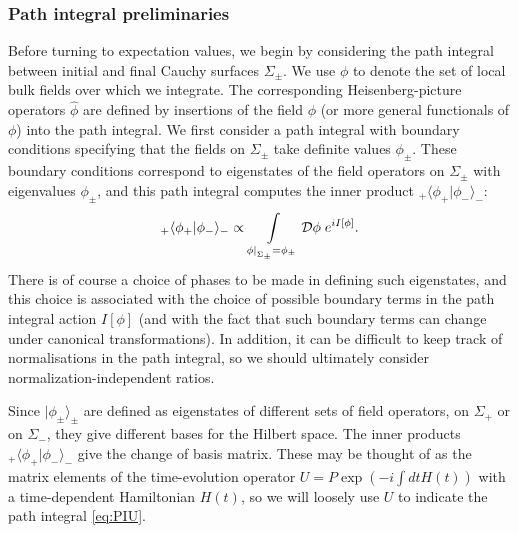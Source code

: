 \documentclass[letterpaper,12pt]{article}
\begin{document}
\subsubsection{Path integral preliminaries}
\label{sec:PIprelim}

Before turning to expectation values, we begin by considering the path integral between initial and final Cauchy surfaces $\Sigma_\pm$.  We use $\phi$ to denote the set of local bulk fields over which we integrate. The corresponding Heisenberg-picture operators $\hat \phi$ are defined by insertions of the field $\phi$ (or more general functionals of $\phi$) into the path integral.  We first consider a path integral with boundary conditions specifying that the fields on $\Sigma_\pm$ take definite values $\phi_{\pm}$. These boundary conditions correspond to eigenstates of the field operators on $\Sigma_\pm$ with eigenvalues $\phi_\pm$, and this path integral computes the inner product ${}_+ \langle \phi_+|\phi_-\rangle_-$:
\begin{equation}\label{eq:PIU}
	{}_+ \langle \phi_+|\phi_-\rangle_- \propto \int\displaylimits_{\left.\phi\right|_{\Sigma_\pm} = \phi_\pm} \mathcal{D}\phi \; e^{i I[\phi]}.
\end{equation}
  There is of course a choice of phases to be made in defining such eigenstates, and this choice is associated with the choice of possible boundary terms in the path integral action $I[\phi]$ (and with the fact that such boundary terms can change under canonical transformations). In addition, it can be difficult to keep track of normalisations in the path integral, so we should ultimately consider normalization-independent ratios. %

Since $|\phi_\pm\rangle_\pm$ are defined as eigenstates of different sets of field operators, on $\Sigma_+$ or on $\Sigma_-$, they give different bases for the Hilbert space. The inner products ${}_+ \langle \phi_+|\phi_-\rangle_-$ give the change of basis matrix. These may be thought of as the matrix elements of the time-evolution operator $U = P\exp\left(-i\int dt H(t)\right)$ with a time-dependent Hamiltonian $H(t)$, so we will loosely use $U$ to indicate the path integral \eqref{eq:PIU}.
\end{document}

